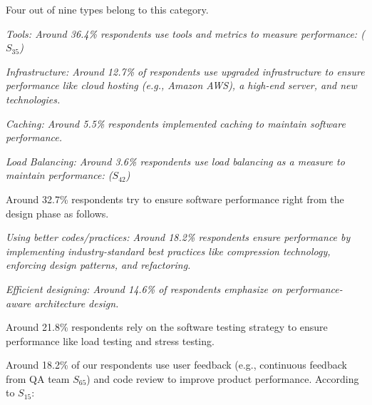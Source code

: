 \begin{inparaenum}[(1)]
\item {} Four out of nine types belong to this category.
\begin{inparaenum}%
    \item \it{Tools}: Around 36.4\% respondents use tools and metrics to
    measure performance:  ($S_{35}$)
    \item \it{Infrastructure}: Around 12.7\% of respondents use upgraded
    infrastructure to ensure performance like cloud
    hosting (e.g., Amazon AWS), a high-end server, and new technologies.
    \item \it{Caching}: Around 5.5\% respondents implemented caching to maintain
    software performance.
    \item \it{Load Balancing}: Around 3.6\% respondents use load
    balancing as a measure to maintain performance:
    ($S_{42}$)
\end{inparaenum}
 
\item {}  Around 32.7\% respondents try to ensure software performance right from the design phase as follows.
\begin{inparaenum}%
    \item \it{Using better codes/practices}: Around 18.2\% respondents ensure performance by
    implementing industry-standard best practices like compression
    technology, enforcing design patterns, and refactoring.
    \item \it{Efficient designing}: Around 14.6\% of respondents emphasize on
    performance-aware architecture design.
\end{inparaenum}

\item {} Around 21.8\% respondents rely on the software testing strategy to ensure performance like load testing and stress testing.

\item {} Around 18.2\% of our respondents use user feedback (e.g., continuous feedback from QA team $S_{65}$) 
and code review to improve product performance. According to $S_{15}$: 
\end{inparaenum}


